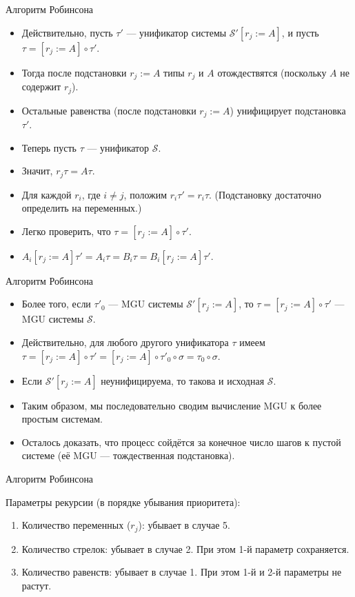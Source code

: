 \documentclass[xcolor=dvipsnames]{beamer}
\newcommand{\Sc}{\mathcal{S}}
\begin{document}
\begin{frame}{Алгоритм Робинсона}

\begin{itemize}[<+->]
 \item Действительно, пусть $\tau'$ --- унификатор системы $\Sc'[r_j := A]$, и пусть $\tau = [r_j := A] \circ \tau'$. 
 \item Тогда после подстановки $r_j := A$ типы $r_j$ и $A$ отождествятся (поскольку $A$ не содержит $r_j$).
 \item Остальные равенства (после подстановки $r_j := A$) унифицирует подстановка $\tau'$.
 \item Теперь пусть $\tau$ --- унификатор $\Sc$.
 \item Значит, $r_j\tau = A\tau$.
 \item Для каждой $r_i$, где $i \ne j$, положим $r_i \tau' = r_i \tau$. (Подстановку достаточно определить на переменных.)
 \item Легко проверить, что $\tau = [r_j := A] \circ \tau'$.
 \item $A_i [r_j := A] \tau' = A_i \tau = B_i \tau = B_i [r_j := A] \tau'$.
\end{itemize}

 
\end{frame}

\begin{frame}{Алгоритм Робинсона}
 
 \begin{itemize}[<+->]
  \item Более того, если $\tau'_0$ --- MGU системы $\Sc'[r_j := A]$, то $\tau = [r_j := A] \circ \tau'$ --- MGU системы $\Sc$.
  \item Действительно, для любого другого унификатора $\tau$ имеем $\tau = [r_j := A] \circ \tau' = [r_j := A] \circ \tau'_0 \circ \sigma = \tau_0 \circ \sigma$.
  \item Если $\Sc'[r_j := A]$ неунифицируема, то такова и исходная $\Sc$.
  \item Таким образом, мы последовательно сводим вычисление MGU к более простым системам.
  \item Осталось доказать, что процесс сойдётся за конечное число шагов к пустой системе (её MGU --- тождественная подстановка).
 \end{itemize}

\end{frame}

\begin{frame}{Алгоритм Робинсона}
 
 Параметры рекурсии (в порядке убывания приоритета):
 
 \begin{enumerate}
  \item Количество переменных ($r_j$): убывает в случае 5.
  \item Количество стрелок: убывает в случае 2. При этом 1-й параметр сохраняется.
  \item Количество равенств: убывает в случае 1. При этом 1-й и 2-й параметры не растут.
 \end{enumerate}

 
\end{frame}
\end{document}
